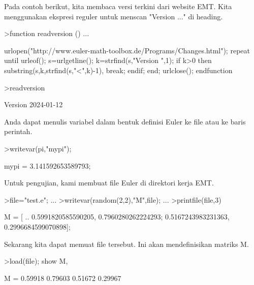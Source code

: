 \documentclass{article}
\begin{document}
\begin{eulernotebook}
\begin{eulercomment}
Pada contoh berikut, kita membaca versi terkini dari website EMT. Kita
menggunakan ekspresi reguler untuk menscan "Version ..." di heading.
\end{eulercomment}
\begin{eulerprompt}
>function readversion () ...
\end{eulerprompt}
\begin{eulerudf}
  urlopen("http://www.euler-math-toolbox.de/Programs/Changes.html");
  repeat
    until urleof();
    s=urlgetline();
    k=strfind(s,"Version ",1);
    if k>0 then substring(s,k,strfind(s,"<",k)-1), break; endif;
  end;
  urlclose();
  endfunction
\end{eulerudf}
\begin{eulerprompt}
>readversion
\end{eulerprompt}
\begin{euleroutput}
  Version 2024-01-12
\end{euleroutput}
\begin{eulercomment}
Anda dapat menulis variabel dalam bentuk definisi Euler ke file atau
ke baris perintah.
\end{eulercomment}
\begin{eulerprompt}
>writevar(pi,"mypi");
\end{eulerprompt}
\begin{euleroutput}
  mypi = 3.141592653589793;
\end{euleroutput}
\begin{eulercomment}
Untuk pengujian, kami membuat file Euler di direktori kerja EMT.
\end{eulercomment}
\begin{eulerprompt}
>file="test.e"; ...
>writevar(random(2,2),"M",file); ...
>printfile(file,3)
\end{eulerprompt}
\begin{euleroutput}
  M = [ ..
  0.5991820585590205, 0.7960280262224293;
  0.5167243983231363, 0.2996684599070898];
\end{euleroutput}
\begin{eulercomment}
Sekarang kita dapat memuat file tersebut. Ini akan mendefinisikan
matriks M.
\end{eulercomment}
\begin{eulerprompt}
>load(file); show M,
\end{eulerprompt}
\begin{euleroutput}
  M = 
    0.59918   0.79603 
    0.51672   0.29967 
\end{euleroutput}

\end{eulernotebook}
\end{document}
